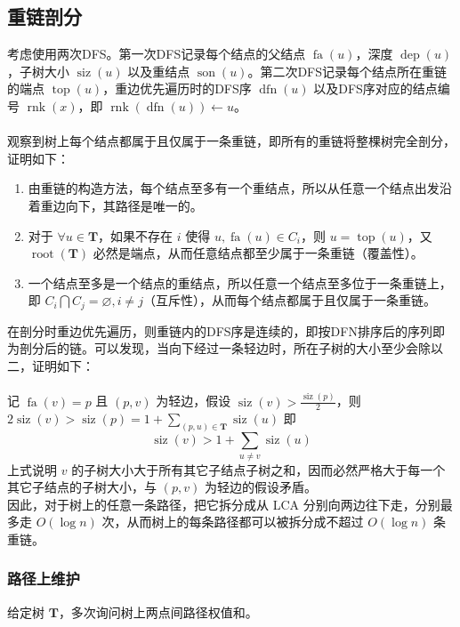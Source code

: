 \documentclass[12pt,a4paper]{article}
\begin{document}
\subsection{重链剖分}
考虑使用两次DFS。第一次DFS记录每个结点的父结点 $\operatorname{fa}(u)$，深度 $\operatorname{dep}(u)$，子树大小 $\operatorname{siz}(u)$ 以及重结点 $\operatorname{son}(u)$。第二次DFS记录每个结点所在重链的端点 $\operatorname{top}(u)$，重边优先遍历时的DFS序 $\operatorname{dfn}(u)$ 以及DFS序对应的结点编号 $\operatorname{rnk}(x)$，即 $\operatorname{rnk}(\operatorname{dfn}(u))\leftarrow u$。\\\\
观察到树上每个结点都属于且仅属于一条重链，即所有的重链将整棵树完全剖分，证明如下：
\begin{enumerate}
	\item 由重链的构造方法，每个结点至多有一个重结点，所以从任意一个结点出发沿着重边向下，其路径是唯一的。
	\item 对于 $\forall u\in\mathbf{T}$，如果不存在 $i$ 使得 $u,\operatorname{fa}(u)\in C_i$，则 $u=\operatorname{top}(u)$，又 $\operatorname{root}(\mathbf{T})$ 必然是端点，从而任意结点都至少属于一条重链（覆盖性）。
	\item 一个结点至多是一个结点的重结点，所以任意一个结点至多位于一条重链上，即 $C_i\bigcap C_j=\varnothing,i\ne j$（互斥性），从而每个结点都属于且仅属于一条重链。
\end{enumerate}
在剖分时重边优先遍历，则重链内的DFS序是连续的，即按DFN排序后的序列即为剖分后的链。可以发现，当向下经过一条轻边时，所在子树的大小至少会除以二，证明如下：\\\\
记 $\operatorname{fa}(v)=p$ 且 $(p,v)$ 为轻边，假设 $\displaystyle\operatorname{siz}(v)>\frac{\operatorname{siz}(p)}{2}$，则$\displaystyle2\operatorname{siz}(v)>\operatorname{siz}(p)=1+\sum_{(p,u)\in\mathbf{T}}\operatorname{siz}(u)$
即
\begin{equation*}
	\operatorname{siz}(v)>1+\sum_{u\ne v}\operatorname{siz}(u)
\end{equation*}
上式说明 $v$ 的子树大小大于所有其它子结点子树之和，因而必然严格大于每一个其它子结点的子树大小，与 $(p,v)$ 为轻边的假设矛盾。\\
因此，对于树上的任意一条路径，把它拆分成从 LCA 分别向两边往下走，分别最多走 $O(\log n)$ 次，从而树上的每条路径都可以被拆分成不超过 $O(\log n)$ 条重链。

\newpage
\subsubsection{路径上维护}
\begin{mdframed}[leftline=true, linewidth=2pt, linecolor=gray]
	给定树 $\mathbf{T}$，多次询问树上两点间路径权值和。
\end{mdframed}
\end{document}
